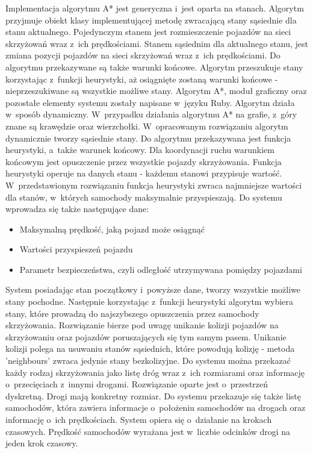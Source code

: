 \newline
\indent 
Implementacja algorytmu A* jest generyczna i~jest oparta na stanach. Algorytm przyjmuje obiekt klasy implementującej metodę zwracającą stany sąsiednie dla stanu aktualnego. Pojedynczym stanem jest rozmieszczenie pojazdów na sieci skrzyżowań wraz z~ich prędkościami. Stanem sąsiednim dla aktualnego stanu, jest zmiana pozycji pojazdów na sieci skrzyżowań wraz z~ich prędkościami. Do algorytmu przekazywane są także warunki końcowe. Algorytm przeszukuje stany korzystając z~funkcji heurystyki, aż osiągnięte zostaną warunki końcowe - nieprzeszukiwane są wszystkie możliwe stany. Algorytm A*, moduł graficzny oraz pozostałe elementy systemu zostały napisane w~języku Ruby. Algorytm działa w~sposób dynamiczny. W~przypadku działania algorytmu A* na grafie, z~góry znane są krawędzie oraz wierzchołki. W~opracowanym rozwiązaniu algorytm dynamicznie tworzy sąsiednie stany.
\newline
\indent
Do algorytmu przekazywana jest funkcja heurystyki, a~także warunek końcowy. Dla koordynacji ruchu warunkiem końcowym jest opuszczenie przez wszystkie pojazdy skrzyżowania. Funkcja heurystyki operuje na danych stanu - każdemu stanowi przypisuje wartość. W~przedstawionym rozwiązaniu funkcja heurystyki zwraca najmniejsze wartości dla stanów, w~których samochody maksymalnie przyspieszają.
\newline
\newline
\noindent
Do systemu wprowadza się także następujące dane:
\begin{itemize}
\item Maksymalną prędkość, jaką pojazd może osiągnąć
\item Wartości przyspieszeń pojazdu
\item Parametr bezpieczeństwa, czyli odległość utrzymywana pomiędzy pojazdami
\end{itemize}
System posiadając stan początkowy i~powyższe dane, tworzy wszystkie możliwe stany pochodne. Następnie korzystając z~funkcji heurystyki algorytm wybiera stany, które prowadzą do najszybszego opuszczenia przez samochody skrzyżowania.
\newline
\indent
Rozwiązanie bierze pod uwagę unikanie kolizji pojazdów na skrzyżowaniu oraz pojazdów poruszających się tym samym pasem. Unikanie kolizji polega na usuwaniu stanów sąsiednich, które powodują kolizję - metoda 'neighbours' zwraca jedynie stany bezkolizyjne.
\newline
\indent
Do systemu można przekazać każdy rodzaj skrzyżowania jako listę dróg wraz z~ich rozmiarami oraz informację o~przecięciach z~innymi drogami. Rozwiązanie oparte jest o~przestrzeń dyskretną. Drogi mają konkretny rozmiar. Do systemu przekazuje się także listę samochodów, która zawiera informacje o~położeniu samochodów na drogach oraz informację o~ich prędkościach. System opiera się o~działanie na krokach czasowych. Prędkość samochodów wyrażana jest w~liczbie odcinków drogi na jeden krok czasowy.

